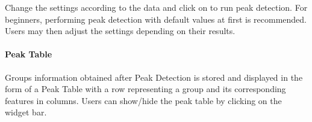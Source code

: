 \documentclass[letterpaper,10pt,english,openany,oneside]{sphinxmanual}
\begin{document}
Change the settings according to the data and click on  to run peak detection. For beginners, performing peak detection with default values at first is recommended. Users may then adjust the settings depending on their results.




\paragraph{Peak Table}
\label{\detokenize{IntroductiontoElMAVENUI:peak-table}}

Groups information obtained after Peak Detection is stored and displayed in the form of a Peak Table with a row representing a group and its corresponding features in columns. Users can show/hide the peak table by clicking on  the widget bar.

\end{document}
